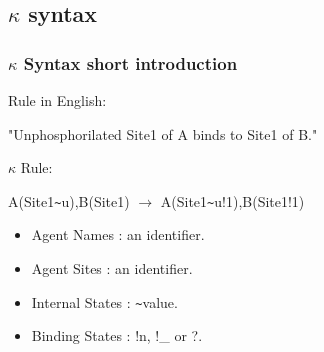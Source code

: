 \documentclass[xcolor=dvipsnames]{beamer}
\def\int{\hbox{\texttt{\~}}}
\begin{document}
\subsection{$\kappa$ syntax}
\begin{frame}
  \frametitle{$\kappa$ Syntax short introduction}
  \begin{flushleft}
    Rule in English:
    \item "Unphosphorilated Site1 of A binds to Site1 of B."
    \newline \pause
    \item $\kappa$ Rule:
    \item A(Site1\int u),B(Site1) $\rightarrow$ A(Site1\int u!1),B(Site1!1)
    \newline \pause
    \begin{itemize}
      \item Agent Names     : an identifier.
      \item Agent Sites     : an identifier.
      \item Internal States : \int \textlangle value\textrangle.
      \item Binding States  : !\textlangle n\textrangle, !\_ or ?.
    \end{itemize}
  \end{flushleft}
\end{frame}
\end{document}
